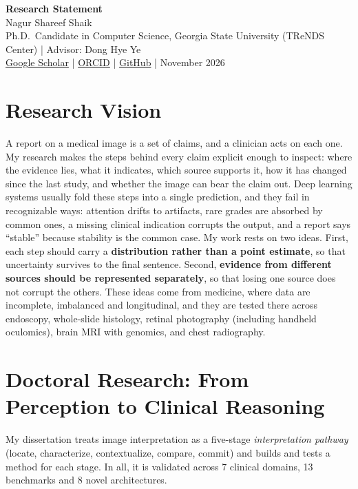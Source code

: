 \documentclass[10pt,letterpaper]{article}
\begin{document}
\begin{center}
{\LARGE\bfseries Research Statement}\\[3pt]
{\large Nagur Shareef Shaik}\\[1pt]
{\small Ph.D.\ Candidate in Computer Science, Georgia State University (TReNDS Center) \;|\; Advisor: Dong Hye Ye\\
\href{https://scholar.google.com/citations?user=rkfPEjUAAAAJ}{Google Scholar} \;|\;
\href{https://orcid.org/0000-0002-2432-7409}{ORCID} \;|\;
\href{https://github.com/ShaikNagurShareef}{GitHub} \;|\; November 2026}
\end{center}

\section{Research Vision}
A report on a medical image is a set of claims, and a clinician acts on each one. My research makes the steps behind every claim explicit enough to inspect: where the evidence lies, what it indicates, which source supports it, how it has changed since the last study, and whether the image can bear the claim out. Deep learning systems usually fold these steps into a single prediction, and they fail in recognizable ways: attention drifts to artifacts, rare grades are absorbed by common ones, a missing clinical indication corrupts the output, and a report says ``stable'' because stability is the common case. My work rests on two ideas. First, each step should carry a \textbf{distribution rather than a point estimate}, so that uncertainty survives to the final sentence. Second, \textbf{evidence from different sources should be represented separately}, so that losing one source does not corrupt the others. These ideas come from medicine, where data are incomplete, imbalanced and longitudinal, and they are tested there across endoscopy, whole-slide histology, retinal photography (including handheld oculomics), brain MRI with genomics, and chest radiography.

\section{Doctoral Research: From Perception to Clinical Reasoning}
My dissertation treats image interpretation as a five-stage \emph{interpretation pathway} (locate, characterize, contextualize, compare, commit) and builds and tests a method for each stage. In all, it is validated across 7 clinical domains, 13 benchmarks and 8 novel architectures.
\end{document}
